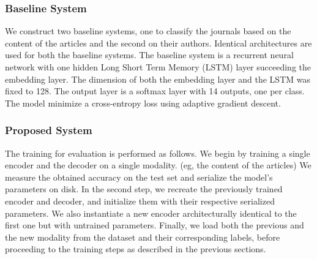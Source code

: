 \documentclass[12pt]{article}
\begin{document}
\subsubsection{Baseline System}
We construct two baseline systems, one to classify the journals based on the
content of the articles and the second on their authors. Identical architectures are used for both the baseline
systems. The baseline system is a recurrent neural network with one hidden Long Short Term Memory (LSTM) layer succeeding the embedding layer. The dimension of both the embedding layer and the LSTM was fixed to 128. The output layer is a softmax layer with 14 outputs, one per class. The model minimize a cross-entropy loss using adaptive gradient descent. \cite{duchi2011adaptive}

\subsubsection{Proposed System}
The training for evaluation is performed as follows. We begin by training a single encoder and the decoder on a single modality.
(eg, the content of the articles) We measure the obtained accuracy on the test set and serialize the model's parameters on disk. In the second step, we recreate the previously trained encoder and decoder, and initialize them with their respective serialized parameters. We also instantiate a new encoder architecturally identical to the first one but with untrained parameters. Finally, we load both the previous and the new modality from the dataset and their corresponding labels, before proceeding to the training steps as described in the previous sections.



\end{document}
